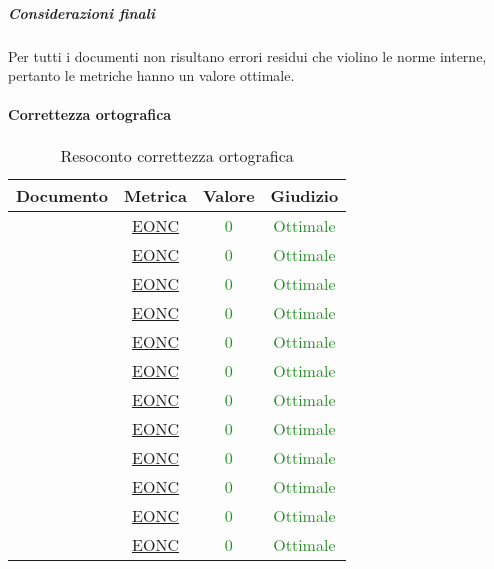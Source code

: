 						\subparagraph{Considerazioni finali}
							Per tutti i documenti non risultano errori residui che violino le norme interne, pertanto le metriche hanno un valore ottimale.
						
						
				\paragraph{Correttezza ortografica}
					\begin{table}[H]
						\centering
						\small
						\begin{tabular}{c | c | c | c}
							\hline
							\textbf{Documento} & \textbf{Metrica} & \textbf{Valore} & \textbf{Giudizio} \\
							\hline
							\pdpvuno & \hyperref[MCO]{EONC} & \textcolor{ForestGreen}{0} & \textcolor{ForestGreen}{Ottimale} \\
							\pdqvuno & \hyperref[MCO]{EONC} & \textcolor{ForestGreen}{0} & \textcolor{ForestGreen}{Ottimale}\\
							\ndpvuno & \hyperref[MCO]{EONC} &\textcolor{ForestGreen}{0} & \textcolor{ForestGreen}{Ottimale}\\
							\sdfv & \hyperref[MCO]{EONC} & \textcolor{ForestGreen}{0} & \textcolor{ForestGreen}{Ottimale}\\
							\adrvuno & \hyperref[MCO]{EONC} & \textcolor{ForestGreen}{0} & \textcolor{ForestGreen}{Ottimale}\\
							\glvuno  & \hyperref[MCO]{EONC} & \textcolor{ForestGreen}{0} & \textcolor{ForestGreen}{Ottimale}\\
							\vunoi& \hyperref[MAANI]{EONC} & \textcolor{ForestGreen}{0} & \textcolor{ForestGreen}{Ottimale}\\
							\vduei& \hyperref[MAANI]{EONC} & \textcolor{ForestGreen}{0} & \textcolor{ForestGreen}{Ottimale}\\
							\vtrei & \hyperref[MAANI]{EONC} & \textcolor{ForestGreen}{0} & \textcolor{ForestGreen}{Ottimale}\\
							\vquattroi & \hyperref[MAANI]{EONC} & \textcolor{ForestGreen}{0} & \textcolor{ForestGreen}{Ottimale}\\
							\vunoe & \hyperref[MAANI]{EONC} & \textcolor{ForestGreen}{0} & \textcolor{ForestGreen}{Ottimale}\\
							\vduee & \hyperref[MAANI]{EONC} & \textcolor{ForestGreen}{0} & \textcolor{ForestGreen}{Ottimale}\\
							\hline
						\end{tabular}
						\caption{Resoconto correttezza ortografica}
						\label{tab_resoconto_correttezza_ortografica}
					\end{table}
					
